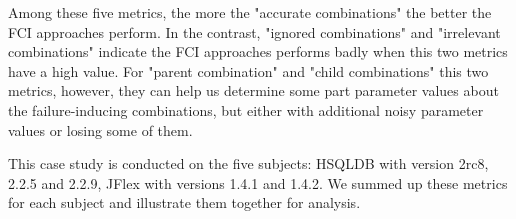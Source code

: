 \documentclass{sig-alternate}
\begin{document}
Among these five metrics, the more the "accurate combinations" the better the FCI approaches perform. In the contrast, "ignored combinations" and "irrelevant combinations" indicate the FCI approaches performs badly when this two metrics have a high value. For "parent combination" and "child combinations" this two metrics, however, they can help us determine some part parameter values about the failure-inducing combinations, but either with additional noisy parameter values or losing some of them.


This case study is conducted on the five subjects: HSQLDB with version 2rc8, 2.2.5 and 2.2.9, JFlex with versions 1.4.1 and 1.4.2. We summed up these metrics for each subject and illustrate them together for analysis.


%
%
%
%
%
%
%
%
\end{document}
